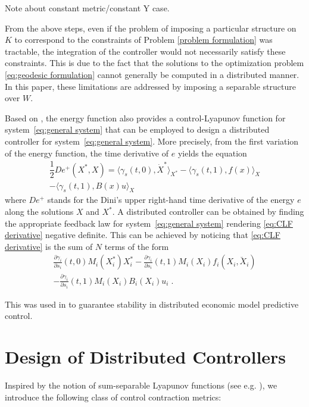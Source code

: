 \documentclass[10pt,twocolumn,twoside]{IEEEtran}
\newcounter{para}
\newcommand\mypara{\par}
\theoremstyle{plain}
\theoremstyle{definition}
\theoremstyle{remark}
\begin{document}
Note about constant metric/constant Y case.

\mypara From the above steps, even if the problem of imposing a particular structure on $K$ to correspond to the constraints of Problem \ref{problem formulation} was tractable, the integration of the controller would not necessarily satisfy these constraints. This is due to the fact that the solutions to the optimization problem \eqref{eq:geodesic formulation} cannot generally be computed in a distributed manner. In this paper, these limitations are addressed by imposing a separable structure over $W$.

\mypara Based on \cite{Manchester2014a}, the energy function also provides a control-Lyapunov function for system~\eqref{eq:general system} that can be employed to design a distributed controller for system~\eqref{eq:general system}. More precisely, from the first variation of the energy function, the time derivative of $e$ yields the equation
\begin{align}
	\dfrac{1}{2}De^+(X^\ast,X)=\langle \gamma_s(t,0),\dot{X}^\ast\rangle_{X^\ast}-\langle \gamma_s(t,1),f(x)\rangle_{X}\nonumber\\
	-\langle \gamma_s(t,1),B(x)u\rangle_{X}\,\label{eq:CLF derivative}
\end{align}
where $De^+$ stands for the Dini's upper right-hand time derivative of the energy $e$ along the solutions $X$ and $X^\ast$. A distributed controller can be obtained by finding the appropriate feedback law for system~\eqref{eq:general system} rendering \eqref{eq:CLF derivative} negative definite. This can be achieved by noticing that \eqref{eq:CLF derivative} is the sum of $N$ terms of the form
\begin{align*}
	\tfrac{\partial \gamma_i}{\partial s_i}(t,0)M_i(X_i^\ast)X_i^\ast-\tfrac{\partial \gamma_i}{\partial s_i}(t,1)M_i(X_i)f_i(X_i,\breve{X}_i)\\
	-\tfrac{\partial \gamma_i}{\partial s_i}(t,1)M_i(X_i)B_i(X_i)u_i\;.
\end{align*}

This was used in \cite{wang_distributed_2017} to guarantee stability in distributed economic model predictive control.

\section{Design of Distributed Controllers}\label{sec:Design of Decentralized Controllers}

Inspired by the notion of sum-separable Lyapunov functions (see e.g. \cite{Dirr2015}), we introduce the following class of control contraction metrics:
\end{document}
